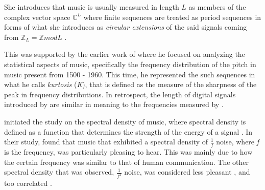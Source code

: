 \begin{comment}
\begin{equation}
\label{eq:1}
l^2(\mathbb{Z}):=\left\{f:\mathbb{Z}\rightarrow\mathbb{C}\sum_{n=-\infty}^\infty|f(n)|^2<\infty \right\}
\end{equation}

\begin{equation}
\label{eq:2}
(f*g)(n)=\sum_m f(m)g(n-m)
\end{equation}
\end{comment}

She introduces that music is usually measured in length \begin{math}L\end{math} as members of the complex vector space \begin{math}\mathbb{C}^L\end{math} where finite sequences are treated as period sequences in forms of what she introduces as \textit{circular extensions} of the said signals coming from \begin{math}\mathbb{Z}_L = \mathbb{Z} mod L\end{math} \citep{dorfler2001time}. 

This was supported by the earlier work of \citet{fucks1962mathematical} where he focused on analyzing the statistical aspects of music, specifically the frequency distribution of the pitch in music present from 1500 - 1960. This time, he represented the such sequences in what he calls \textit{kurtosis} (\textit{K}), that is defined as the measure of the sharpness of the peak in frequency distributions. In retrospect, the length of digital signals introduced by \cite{dorfler2001time} are similar in meaning to the frequencies measured by \cite{fucks1962mathematical}. 

\begin{comment}
\begin{equation}
\label{eq:3}
K = \frac{\mu^4}{\sigma^4}
\end{equation}

\begin{equation}
\label{eq:4}
\mu_v = \sum_x(x-\overline{x})^v\cdot p_x
\end{equation}

\begin{equation}
\label{eq:5}
\overline{x} = \sum_x\cdot p_x
\end{equation}
\end{comment}

\citet{voss1978noise} initiated the study on the spectral density of music, where spectral density is defined as a function that determines the strength of the energy of a signal \citep{stoica1997introduction, martin2001noise}. In their study, \citeauthor{voss1978noise} found that music that exhibited a spectral density of $\frac{1}{f}$ noise, where \textit{f} is the frequency, was particularly pleasing to hear. This was mainly due to how the certain frequency was similar to that of human communication. The other spectral density that was observed, $\frac{1}{f^2}$ noise, was considered less pleasant \citep{gunduz2005mathematical}, and too correlated \citep{voss1978noise,nettheim1992on}. 

